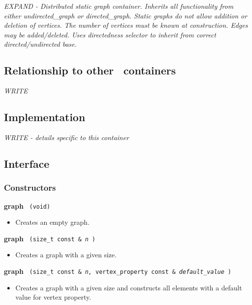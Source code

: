 \textit{EXPAND - Distributed static graph container. Inherits all functionality from either undirected\_graph or directed\_graph.  Static graphs do not allow addition or deletion of vertices. The number of vertices must be known at construction. Edges may be added/deleted. Uses directedness selector to inherit from correct directed/undirected base. }
 
\subsection{Relationship to other \stapl\ containers}

\textit{WRITE}

\subsection{Implementation}

\textit{WRITE - details specific to this container}

\subsection{Interface} \label{sec-stgraf-cont-inter}

\subsubsection{Constructors}

\noindent
\textbf{graph}%
\texttt{%
(void)
}

\begin{itemize}
\item
Creates an empty graph.
\end{itemize}
 
\noindent
\textbf{graph}%
\texttt{%
(size\_t const \&
\textit{n}%
)
}

\begin{itemize}
\item
Creates a graph with a given size.
\end{itemize}
 
\noindent
\textbf{graph}%
\texttt{%
(size\_t const \&
\textit{n,}%
vertex\_property const \&
\textit{default\_value}%
)
}

\begin{itemize}
\item
Creates a graph with a given size and constructs all elements with a default value for vertex property.
\end{itemize}
 

